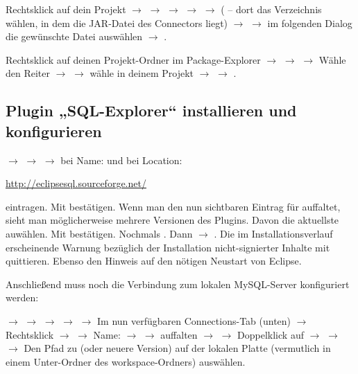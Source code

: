 Rechtsklick auf dein Projekt $\rightarrow$  $\rightarrow$
 $\rightarrow$  $\rightarrow$ 
$\rightarrow$  ( -- dort das Verzeichnis
wählen, in dem die JAR-Datei des Connectors liegt) $\rightarrow$ 
$\rightarrow$ im folgenden Dialog die gewünschte Datei auswählen $\rightarrow$
.

Rechtsklick auf deinen Projekt-Ordner im Package-Explorer $\rightarrow$
 $\rightarrow$ 
$\rightarrow$ Wähle den Reiter  $\rightarrow$  $\rightarrow$ wähle  in
deinem Projekt $\rightarrow$  $\rightarrow$ .

\subsection{Plugin „SQL-Explorer“ installieren und konfigurieren}

 $\rightarrow$  $\rightarrow$
 $\rightarrow$ bei Name:  und bei Location:

\url{http://eclipsesql.sourceforge.net/} 

eintragen. Mit  bestätigen. Wenn man den nun sichtbaren Eintrag für
 auffaltet, sieht man möglicherweise mehrere Versionen des
Plugins. Davon die aktuellste auwählen. Mit  bestätigen. Nochmals
. Dann 
$\rightarrow$ . Die im Installationsverlauf erscheinende Warnung
bezüglich der Installation nicht-signierter Inhalte mit  quittieren.
Ebenso den Hinweis auf den nötigen Neustart von Eclipse.

Anschließend muss noch die Verbindung zum lokalen MySQL-Server konfiguriert
werden:

 $\rightarrow$  $\rightarrow$  $\rightarrow$  $\rightarrow$ 
$\rightarrow$  Im nun verfügbaren Connections-Tab (unten)
$\rightarrow$ Rechtsklick $\rightarrow$ 
$\rightarrow$ Name:  $\rightarrow$  $\rightarrow$  auffalten $\rightarrow$  $\rightarrow$ Doppelklick auf   $\rightarrow$
 $\rightarrow$  $\rightarrow$
Den Pfad zu  (oder neuere Version)
auf der lokalen Platte (vermutlich in einem Unter-Ordner des workspace-Ordners)
auswählen.

